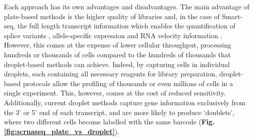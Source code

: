 Each approach has its own advantages and disadvantages.
The main advantage of plate-based methods is the higher quality of libraries and, in the case of Smart-seq, the full length transcript information which enables the quantification of splice variants \cite{westoby2018simulation}, allele-specific expression \cite{jiang2017scale} and RNA velocity information \cite{la2018rna}. 
However, this comes at the expense of lower cellular throughput, processing hundreds or thousands of cells compared to the hundreds of thousands that droplet-based methods can achieve.
Indeed, by capturing cells in individual droplets, each containing all necessary reagents for library preparation, droplet-based protocols allow the profiling of thousands or even millions of cells in a single experiment. 
This, however, comes at the cost of reduced sensitivity.
Additionally, current droplet methods capture gene information exclusively from the 3’ or 5’ end of each transcript, and are more likely to produce `doublets', where two different cells become labelled with the same barcode (\textbf{Fig. \ref{fig:scrnaseq_plate_vs_droplet}}). \\

